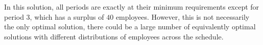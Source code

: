 \documentclass[12pt]{article}
\theoremstyle{definition}
\begin{document}
In this solution, all periods are exactly at their minimum requirements except for period 3, which has a surplus of $40$ employees. However, this is not necessarily the only optimal solution, there could be a large number of equivalently optimal solutions with different distributions of employees across the schedule.
\end{document}
